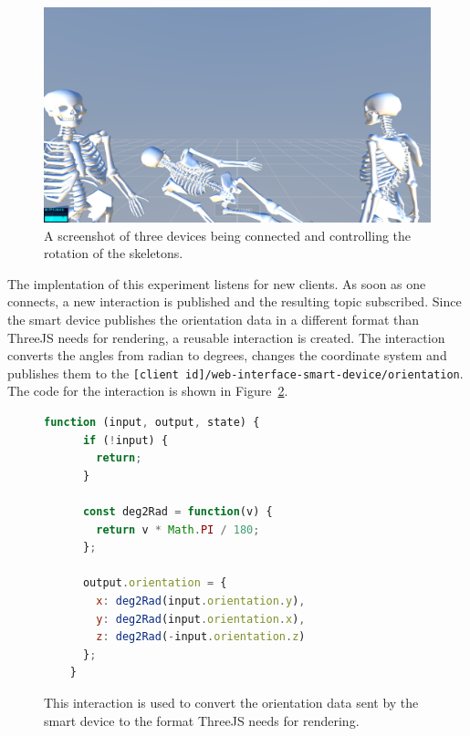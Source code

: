 \begin{figure}[htpb]
  \centering
  \includegraphics[width=12cm]{figures/screenshot_exp_mv.png}
  \caption[Screenshot: model viewer experiment]{A screenshot of three devices being connected and controlling the rotation of the skeletons.}\label{fig:screenshot-exp-mv}
\end{figure}

The implentation of this experiment listens for new clients. As soon as one connects, a new interaction is published and the resulting topic subscribed. Since the smart device publishes the orientation data in a different format than ThreeJS needs for rendering, a reusable interaction is created. The interaction converts the angles from radian to degrees, changes the coordinate system and publishes them to the \lstinline{[client id]/web-interface-smart-device/orientation}. The code for the interaction is shown in Figure~\ref{fig:ubii-interaction-angles}.

\begin{figure}[H]
  \begin{lstlisting}[language=JavaScript]
    function (input, output, state) {
      if (!input) {
        return;
      }

      const deg2Rad = function(v) {
        return v * Math.PI / 180;
      };

      output.orientation = {
        x: deg2Rad(input.orientation.y),
        y: deg2Rad(input.orientation.x),
        z: deg2Rad(-input.orientation.z)
      };
    }
  \end{lstlisting}
  \caption[UBII interaction converting euler angles in radians to degrees]{This interaction is used to convert the orientation data sent by the smart device to the format ThreeJS needs for rendering. }\label{fig:ubii-interaction-angles}
\end{figure}